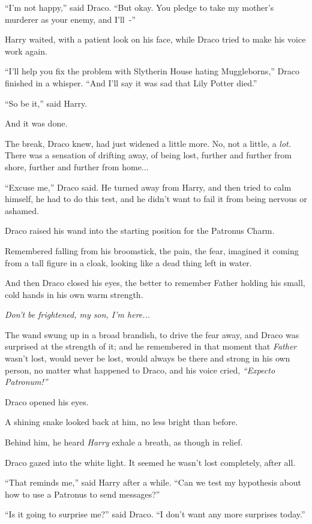 ``I'm not happy,'' said Draco. ``But okay. You pledge to take my mother's murderer as your enemy, and I'll~-''

Harry waited, with a patient look on his face, while Draco tried to make his voice work again.

``I'll help you fix the problem with Slytherin House hating Muggleborns,'' Draco finished in a whisper. ``And I'll say it was sad that Lily Potter died.''

``So be it,'' said Harry.

And it was done.

The break, Draco knew, had just widened a little more. No, not a little, a \emph{lot.} There was a sensation of drifting away, of being lost, further and further from shore, further and further from home...

``Excuse me,'' Draco said. He turned away from Harry, and then tried to calm himself, he had to do this test, and he didn't want to fail it from being nervous or ashamed.

Draco raised his wand into the starting position for the Patronus Charm.

Remembered falling from his broomstick, the pain, the fear, imagined it coming from a tall figure in a cloak, looking like a dead thing left in water.

And then Draco closed his eyes, the better to remember Father holding his small, cold hands in his own warm strength.

\emph{Don't be frightened, my son, I'm here...}

The wand swung up in a broad brandish, to drive the fear away, and Draco was surprised at the strength of it; and he remembered in that moment that \emph{Father} wasn't lost, would never be lost, would always be there and strong in his own person, no matter what happened to Draco, and his voice cried, \emph{``Expecto Patronum!''}

Draco opened his eyes.

A shining snake looked back at him, no less bright than before.

Behind him, he heard \emph{Harry} exhale a breath, as though in relief.

Draco gazed into the white light. It seemed he wasn't lost completely, after all.

``That reminds me,'' said Harry after a while. ``Can we test my hypothesis about how to use a Patronus to send messages?''

``Is it going to surprise me?'' said Draco. ``I don't want any more surprises today.''

